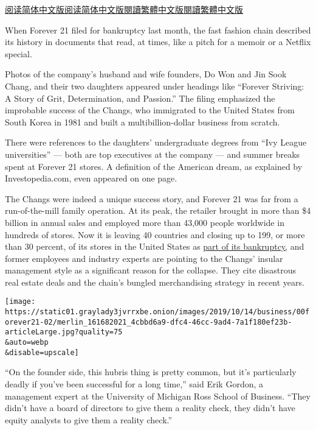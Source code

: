 \href{https://cn.nytimes3xbfgragh.onion/business/20191030/forever-21-bankruptcy-chang-family/}{阅读简体中文版}\href{https://cn.nytimes3xbfgragh.onion/business/20191030/forever-21-bankruptcy-chang-family/}{阅读简体中文版}\href{https://cn.nytimes3xbfgragh.onion/business/20191030/forever-21-bankruptcy-chang-family/zh-hant/}{閱讀繁體中文版}\href{https://cn.nytimes3xbfgragh.onion/business/20191030/forever-21-bankruptcy-chang-family/zh-hant/}{閱讀繁體中文版}

When Forever 21 filed for bankruptcy last month, the fast fashion chain
described its history in documents that read, at times, like a pitch for
a memoir or a Netflix special.

Photos of the company's husband and wife founders, Do Won and Jin Sook
Chang, and their two daughters appeared under headings like ``Forever
Striving: A Story of Grit, Determination, and Passion.'' The filing
emphasized the improbable success of the Changs, who immigrated to the
United States from South Korea in 1981 and built a multibillion-dollar
business from scratch.

There were references to the daughters' undergraduate degrees from ``Ivy
League universities'' --- both are top executives at the company --- and
summer breaks spent at Forever 21 stores. A definition of the American
dream, as explained by Investopedia.com, even appeared on one page.

The Changs were indeed a unique success story, and Forever 21 was far
from a run-of-the-mill family operation. At its peak, the retailer
brought in more than \$4 billion in annual sales and employed more than
43,000 people worldwide in hundreds of stores. Now it is leaving 40
countries and closing up to 199, or more than 30 percent, of its stores
in the United States as
\href{https://www.nytimes3xbfgragh.onion/2019/09/29/business/forever-21-bankruptcy.html}{part
of its bankruptcy,} and former employees and industry experts are
pointing to the Changs' insular management style as a significant reason
for the collapse. They cite disastrous real estate deals and the chain's
bungled merchandising strategy in recent years.

\texttt{[image: https://static01.graylady3jvrrxbe.onion/images/2019/10/14/business/00forever21-02/merlin\_161682021\_4cbbd6a9-dfc4-46cc-9ad4-7a1f180ef23b-articleLarge.jpg?quality=75\\\&auto=webp\\\&disable=upscale]}

``On the founder side, this hubris thing is pretty common, but it's
particularly deadly if you've been successful for a long time,'' said
Erik Gordon, a management expert at the University of Michigan Ross
School of Business. ``They didn't have a board of directors to give them
a reality check, they didn't have equity analysts to give them a reality
check.''

